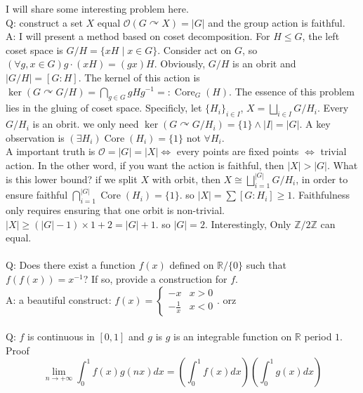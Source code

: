 \documentclass[10pt,a4paper]{article}
\begin{document}
I will share some interesting problem here.\\
Q: construct a set $X$ equal $\mathcal{O}(G\curvearrowright X)=|G|$ and the group action is faithful.\\
A: I will present a method based on coset decomposition. For $H\le G$, the left coset space is $G/H=\{xH\mid x\in G\}$.
Consider act on $G$, so $(\forall g,x\in G)g\cdot(xH)=(gx)H$. Obviously, $G/H$ is an obrit and $|G/H|=[G:H]$.
The kernel of this action is $\ker(G\curvearrowright G/H)=\bigcap\limits_{g\in G}gHg^{-1}=:\operatorname{Core}_G(H)$.
The essence of this problem lies in the gluing of coset space. Specificly, let $\{H_i\}_{i\in I}$, $X=\bigsqcup\limits_{i\in I}G/H_i$.
Every $G/H_i$ is an obrit. we only need $\ker(G\curvearrowright G/H_i)=\{1\}\land|I|=|G|$. A key observation is $(\exists H_i)\operatorname{Core}(H_i)=\{1\}$ not $\forall H_i$.
\\
A important truth is $\mathcal{O}=|G|=|X|\iff$ every points are fixed points $\iff$ trivial action.
In the other word, if you want the action is faithful, then $|X|>|G|$. What is this lower bound? if we split $X$ with orbit, 
then $X\cong\bigsqcup\limits_{i=1}^{|G|}G/H_i$, in order to ensure faithful $\bigcap\limits_{i=1}^{|G|}\operatorname{Core}(H_i)=\{1\}$.
so $|X|=\sum[G:H_i]\ge1$. Faithfulness only requires ensuring that one orbit is non-trivial. $|X|\ge(|G|-1)\times1+2=|G|+1$. so $|G|=2$. Interestingly,
Only $\mathbb{Z}/2\mathbb{Z}$ can equal.
\\
\\
Q: Does there exist a function $f(x)$ defined on $\mathbb{R}/\{0\}$ such that $f(f(x)) = x^{-1}$? If so, provide a construction for $f$.\\
A: a beautiful construct: $f(x)=\begin{cases}-x&x>0\\-\frac{1}{x}&x<0\end{cases}$. orz
\\
\\
Q: $f$ is continuous in $[0,1]$ and $g$ is $g$ is an integrable function on $\mathbb{R}$ period $1$. Proof \[\lim\limits_{n\to+\infty}\int_{0}^{1}f(x)g(nx)dx=(\int_{0}^{1}f(x)dx)(\int_{0}^{1}g(x)dx)\]
\end{document}
